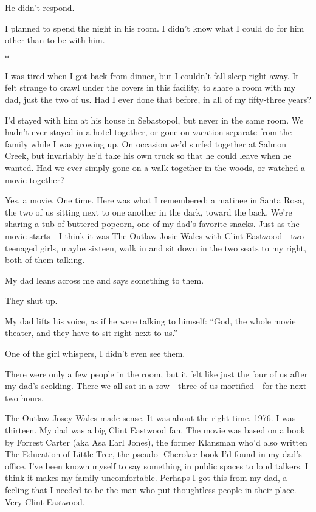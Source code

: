 \documentclass[12pt]{book}
\begin{document}
He didn't respond.

I planned to spend the night in his room. I didn't know what I could do for him other than to be with him.

\begin{center}$*$\end{center}

I was tired when I got back from dinner, but I couldn't fall sleep right away. It felt strange to crawl under the covers in this facility, to share a room with my dad, just the two of us. Had I ever done that before, in all of my fifty-three years?

I'd stayed with him at his house in Sebastopol, but never in the same room. We hadn't ever stayed in a hotel together, or gone on vacation separate from the family while I was growing up. On occasion we'd surfed together at Salmon Creek, but invariably he'd take his own truck so that he could leave when he wanted. Had we ever simply gone on a walk together in the woods, or watched a movie together?

Yes, a movie. One time. Here was what I remembered: a matinee in Santa Rosa, the two of us sitting next to one another in the dark, toward the back. We're sharing a tub of buttered popcorn, one of my dad's favorite snacks. Just as the movie starts---I think it was The Outlaw Josie Wales with Clint Eastwood---two teenaged girls, maybe sixteen, walk in and sit down in the two seats to my right, both of them talking.

My dad leans across me and says something to them.

They shut up.

My dad lifts his voice, as if he were talking to himself: ``God, the whole movie theater, and they have to sit right next to us.''

One of the girl whispers, I didn't even see them.

There were only a few people in the room, but it felt like just the four of us after my dad's scolding. There we all sat in a row---three of us mortified---for the next two hours.

The Outlaw Josey Wales made sense. It was about the right time, 1976. I was thirteen. My dad was a big Clint Eastwood fan. The movie was based on a book by Forrest Carter (aka Asa Earl Jones), the former Klansman who'd also written The Education of Little Tree, the pseudo- Cherokee book I'd found in my dad's office. I've been known myself to say something in public spaces to loud talkers. I think it makes my family uncomfortable. Perhaps I got this from my dad, a feeling that I needed to be the man who put thoughtless people in their place. Very Clint Eastwood.
\end{document}
